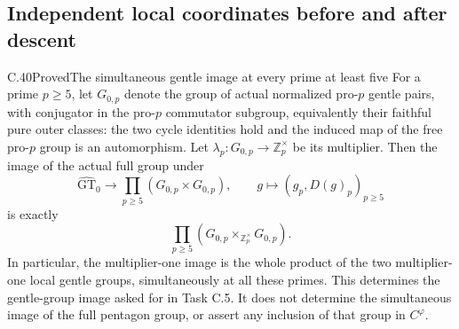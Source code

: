 \subsection{Independent local coordinates before and after descent}

\begin{statement}{C.40}{Proved}{The simultaneous gentle image at every prime at least five}
For a prime $p\geq5$, let $G_{0,p}$ denote the group of actual
normalized pro-$p$ gentle pairs, with conjugator in the pro-$p$
commutator subgroup, equivalently their faithful pure outer classes:
the two cycle identities hold and the induced
map of the free pro-$p$ group is an automorphism. Let
$\lambda_p:G_{0,p}\to\mathbb Z_p^\times$ be its multiplier.
Then the image of the actual full group under
\[
 \widehat{\mathrm{GT}}_0\longrightarrow
 \prod_{p\geq5}(G_{0,p}\times G_{0,p}),\qquad
 g\longmapsto (g_p,D(g)_p)_{p\geq5}
                                                        \tag{C.40.1}
\]
is exactly
\[
 \prod_{p\geq5}
       (G_{0,p}\mathbin\times_{\mathbb Z_p^\times}G_{0,p}).
                                                        \tag{C.40.2}
\]
In particular, the multiplier-one image is the whole product
of the two multiplier-one local gentle groups, simultaneously
at all these primes. This determines the gentle-group image
asked for in Task C.5. It does not determine the simultaneous
image of the full pentagon group, or assert any inclusion of
that group in $C^\varphi$.
\end{statement}

